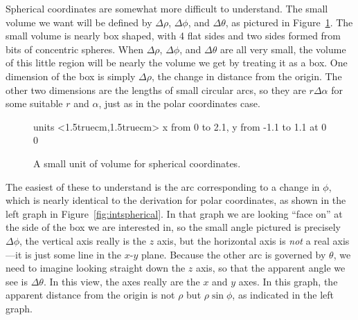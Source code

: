 Spherical coordinates are somewhat more difficult to understand. The
small volume we want will be defined by $\Delta\rho$, $\Delta\phi$,
and $\Delta\theta$, as pictured in Figure~\ref{fig:sphericalvolumeunit}.
The small volume is nearly box shaped, with 4 flat sides and two sides
formed from bits of concentric spheres. When $\Delta\rho$, $\Delta\phi$,
and $\Delta\theta$ are all very small, the volume of this little
region will be nearly the volume we get by treating it as a box.
One dimension of the box is simply $\Delta\rho$, the change in distance
from the origin. The other two dimensions are the lengths of small
circular arcs, so they are $r\Delta\alpha$ for some suitable
$r$ and $\alpha$, just as in the polar coordinates case.

\begin{figure}[H]
\centerline{
\vbox{\beginpicture
\normalgraphs
\setcoordinatesystem units <1.5truecm,1.5truecm>
\setplotarea x from 0 to 2.1, y from -1.1 to 1.1
 at 0 0
\endpicture}}
\caption{A small unit of volume for spherical coordinates.}
\label{fig:sphericalvolumeunit}
\end{figure}

The easiest of these to understand is the arc corresponding to a
change in $\phi$, which is nearly identical to the derivation for
polar coordinates, as shown in the left graph in Figure~\ref{fig:intspherical}.
In that graph we are looking ``face on'' at the side of
the box we are interested in, so the small angle pictured is
precisely $\Delta\phi$, the vertical axis really is the $z$ axis, but
the horizontal axis is \emph{not} a real axis---it is just some line
in the $x$-$y$ plane.
Because the other arc is governed by $\theta$, we need
to imagine looking straight down the $z$ axis, so that the apparent
angle we see is $\Delta\theta$. In this view, the axes really are the
$x$ and $y$ axes.
In this graph, the apparent distance from the
origin is not $\rho$ but $\rho\sin\phi$, as indicated in the left
graph. 

